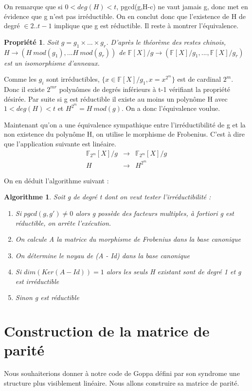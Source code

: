 \documentclass{article}
\newtheorem{prop}{Propriété}
\newtheorem{algo}{Algorithme}
\begin{document}
		On remarque que si $0<deg(H) <t$, pgcd(g,H-c) ne vaut jamais g, donc met en évidence que g n'est pas irréductible.
		On en conclut donc que l'existence de H  de degré $\in 2..t-1$ implique que g est réductible.
		Il reste à montrer l'équivalence.

		\begin{prop}
			Soit $g = g_{1} \times ... \times g_{r}$.
			D'après le théorème des restes chinois, $H \rightarrow (H \ mod(g_{1}),...H \ mod(g_{r}))$ de $\mathbb{F}[X]/g \rightarrow (\mathbb{F}[X]/g_{1},...,\mathbb{F}[X]/g_{r})$ est un isomorphisme d'anneaux.
		\end{prop}

		Comme les $g_{i}$ sont irréductibles, $\{x \in \mathbb{F}[X]/g_{1} , x = x^{2^{m}} \}$ est de cardinal $2^{m}$.
		Donc il existe $2^{mr}$ polynômes de degrés inférieurs à t-1 vérifiant la propriété désirée.
		Par suite si g est réductible il existe au moins un polynôme H avec $1 < deg(H) < t$ et $H^{2^{m}} = H \ mod(g)$.
		On a donc l'équivalence voulue.


		Maintenant qu'on a une équivalence sympathique entre l'irréductibilité de g et la non existence du polynôme H, on utilise le morphisme de Frobenius.
		C'est à dire que l'application suivante est linéaire.
		\begin{eqnarray*}
			\mathbb{F}_{2^{m}}[X]/g &\rightarrow& \mathbb{F}_{2^{m}}[X]/g \\
			H &\rightarrow& H^{2^{m}}
		\end{eqnarray*}

		On en déduit l'algorithme suivant :
		\begin{algo}
			Soit g de degré t dont on veut tester l'irréductibilité :
			\begin{enumerate}
				\item Si $pgcd(g,g') \neq 0$ alors g possède des facteurs multiples, à fortiori g est réductible, on arrête l’exécution.
				\item On calcule A la matrice du morphisme de Frobenius dans la base canonique
				\item On détermine le noyau de (A - Id) dans la base canonique
				\item Si $dim(Ker(A-Id)) = 1$ alors les seuls H existant sont de degré 1 et g est irréductible
				\item Sinon g est réductible
			\end{enumerate}
		\end{algo}

	\section{Construction de la matrice de parité}
		\label{parite}
		\cite{04cc}
		Nous souhaiterions donner à notre code de Goppa défini par son syndrome une structure plus visiblement linéaire. Nous allons construire sa matrice de parité.
\end{document}
